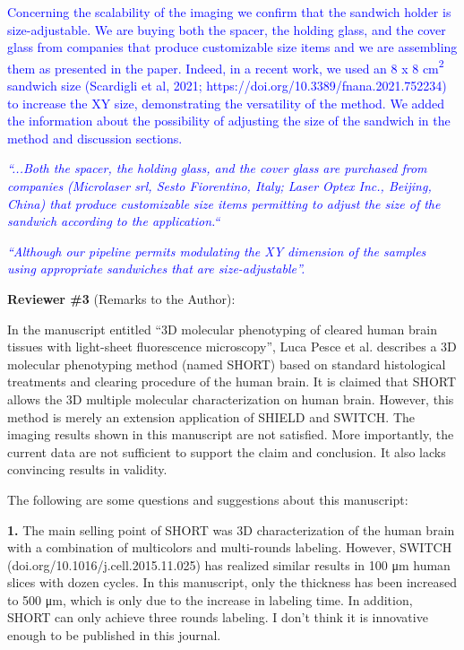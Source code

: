 \documentclass{article}
\newcommand{\reply}[1]{\textcolor{blue}{#1}}
\begin{document}
\noindent \reply{Concerning the scalability of the imaging we confirm that the sandwich holder is size-adjustable.} \reply{We are buying both the spacer, the holding glass, and the cover glass from companies that} \reply{produce customizable size items and we are assembling them as presented in the paper. Indeed,} \reply{in a recent work, we used an 8 x 8 cm}\reply{\textsuperscript{2}} \reply{sandwich size (Scardigli et al, 2021;} \reply{https://doi.org/10.3389/fnana.2021.752234) to increase the XY size, demonstrating the versatility of} \reply{the method. We added the information about the possibility of adjusting the size of the sandwich in} \reply{the method and discussion sections.}

\noindent \reply{\emph{“...Both the spacer, the holding glass, and the cover glass are purchased from companies}} \reply{\emph{(Microlaser srl, Sesto Fiorentino, Italy; Laser Optex Inc., Beijing, China) that produce customizable}} \reply{\emph{size items permitting to adjust the size of the sandwich according to the application.“}}

\noindent \reply{\emph{“Although our pipeline permits modulating the XY dimension of the samples using appropriate}} \reply{\emph{sandwiches that are size-adjustable”.}}

\noindent \textbf{Reviewer \#3} (Remarks to the Author):

\noindent In the manuscript entitled “3D molecular phenotyping of cleared human brain tissues with light-sheet fluorescence microscopy”, Luca Pesce et al. describes a 3D molecular phenotyping method (named SHORT) based on standard histological treatments and clearing procedure of the human brain. It is claimed that SHORT allows the 3D multiple molecular characterization on human brain. However, this method is merely an extension application of SHIELD and SWITCH. The imaging results shown in this manuscript are not satisfied. More importantly, the current data are not sufficient to support the claim and conclusion. It also lacks convincing results in validity.

\noindent The following are some questions and suggestions about this manuscript:

\noindent \textbf{1.} The main selling point of SHORT was 3D characterization of the human brain with a combination of multicolors and multi-rounds labeling. However, SWITCH (doi.org/10.1016/j.cell.2015.11.025) has realized similar results in 100 μm human slices with dozen cycles. In this manuscript, only the thickness has been increased to 500 μm, which is only due to the increase in labeling time. In addition, SHORT can only achieve three rounds labeling. I don’t think it is innovative enough to be published in this journal.
\end{document}
